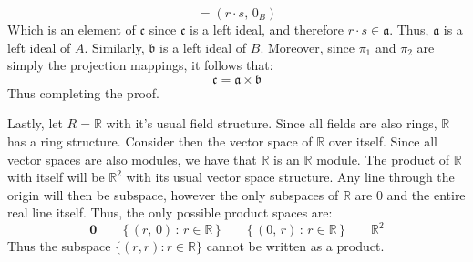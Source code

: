 \documentclass[crop=false,class=article]{standalone}                       %
\begin{document}
\begin{solution}
\begin{equation}
                =(r\cdot{s},\,0_{B})
            \end{equation}
            Which is an element of $\mathfrak{c}$ since $\mathfrak{c}$
            is a left ideal, and therefore $r\cdot{s}\in\mathfrak{a}$. Thus,
            $\mathfrak{a}$ is a left ideal of $A$. Similarly,
            $\mathfrak{b}$ is a left ideal of $B$. Moreover, since
            $\pi_{1}$ and $\pi_{2}$ are simply the projection mappings,
            it follows that:
            \begin{equation}
                \mathfrak{c}=\mathfrak{a}\times\mathfrak{b}
            \end{equation}
            Thus completing the proof.
            \par\hfill\par
            Lastly, let $R=\mathbb{R}$ with it's usual field structure.
            Since all fields are also rings, $\mathbb{R}$ has a ring
            structure. Consider then the vector space of $\mathbb{R}$ over
            itself. Since all vector spaces are also modules, we have that
            $\mathbb{R}$ is an $\mathbb{R}$ module. The product of
            $\mathbb{R}$ with itself will be $\mathbb{R}^{2}$ with its
            usual vector space structure. Any line through the origin will
            then be subspace, however the only subspaces of
            $\mathbb{R}$ are $0$ and the entire real line itself. Thus,
            the only possible product spaces are:
            \begin{equation*}
                \mathbf{0}
                \quad\quad
                \{\,(r,\,0)\,:\,r\in\mathbb{R}\,\}
                \quad\quad
                \{\,(0,\,r)\,:\,r\in\mathbb{R}\,\}
                \quad\quad
                \mathbb{R}^{2}
            \end{equation*}
            Thus the subspace $\{(r,r):r\in\mathbb{R}\}$ cannot be written
            as a product.
        \end{solution}
\end{document}
